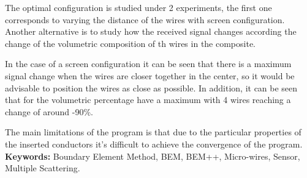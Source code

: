 \documentclass[12pt,letterpaper]{article}
\numberwithin{equation}{section}
\begin{document}
The optimal configuration is studied under 2 experiments, the first one corresponds to varying the distance of the wires with screen configuration. Another alternative is to study how the received signal changes according the change of the volumetric composition of th wires in the composite.

In the case of a screen configuration it can be seen that there is a maximum signal change when the wires are closer together in the center, so it would be advisable to position the wires as close as possible. In addition, it can be seen that for the volumetric percentage have a maximum with 4 wires reaching a change of around -90\%.

The main limitations of the program is that due to the particular properties of the inserted conductors it's difficult to achieve the convergence of the program. \\

\noindent\textbf{Keywords:} Boundary Element Method, BEM, BEM++, Micro-wires, Sensor,\\ Multiple Scattering.
\pagebreak
\end{document}
